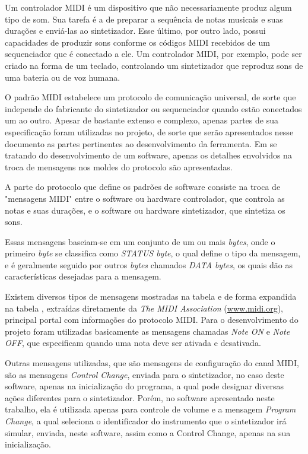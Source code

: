 \documentclass[12pt]{report}
\begin{document}
Um controlador MIDI é um dispositivo que não necessariamente produz
algum tipo de som. Sua tarefa é a de preparar a sequência de notas
musicais e suas durações e enviá-las ao sintetizador. Esse último, por
outro lado, possui capacidades de produzir sons conforme os códigos
MIDI recebidos de um sequenciador que é conectado a ele. Um controlador
MIDI, por exemplo, pode ser criado na forma de um teclado, controlando
um sintetizador que reproduz sons de uma bateria ou de voz humana.

O padrão MIDI estabelece um protocolo de comunicação universal, de
sorte que independe do fabricante do sintetizador ou sequenciador
quando estão conectados um ao outro. Apesar de bastante extenso e
complexo, apenas partes de sua especificação foram utilizadas no
projeto, de sorte que serão apresentados nesse documento as partes
pertinentes ao desenvolvimento da ferramenta. Em se tratando do
desenvolvimento de um software, apenas os detalhes envolvidos na
troca de mensagens nos moldes do protocolo são apresentadas.

A parte do protocolo que define os padrões de software consiste na
troca de "mensagens MIDI" entre o software ou hardware controlador,
que controla as notas e suas durações, e o software ou hardware
sintetizador, que sintetiza os sons.

Essas mensagens baseiam-se em um conjunto de um ou mais {\it bytes},
onde o primeiro {\it byte} se classifica como {\it STATUS byte}, o
qual define o tipo da mensagem, e é geralmente seguido por outros {\it
  bytes} chamados {\it DATA bytes}, os quais dão as características
desejadas para a mensagem.

Existem diversos tipos de mensagens mostradas na tabela \cite{tabela1} e de forma expandida na tabela \cite{tabela2}, extraídas
diretamente da {\it The MIDI Association} (\url{www.midi.org}),
principal portal com informações do protocolo MIDI. Para o
desenvolvimento do projeto foram utilizadas basicamente as mensagens
chamadas {\it Note ON} e {\it Note OFF}, que especificam quando uma
nota deve ser ativada e desativada.

Outras mensagens utilizadas, que são mensagens de
configuração do canal MIDI, são as mensagens {\it Control Change},
enviada para o sintetizador, no caso deste software, apenas na
inicialização do programa, a qual pode designar diversas ações
diferentes para o sintetizador. Porém, no software apresentado neste
trabalho, ela é utilizada apenas para controle de volume e a mensagem
{\it Program Change}, a qual seleciona o identificador do instrumento
que o sintetizador irá simular, enviada, neste software, assim como a
Control Change, apenas na sua inicialização.
\end{document}
